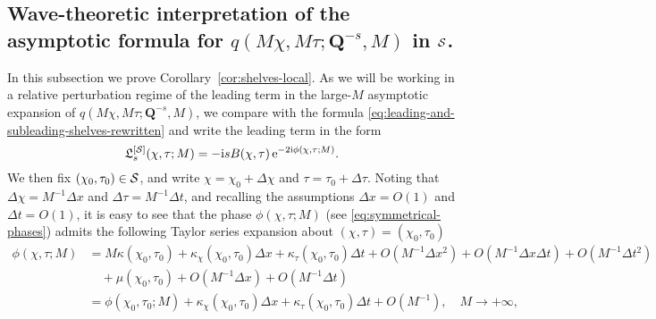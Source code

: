 \subsection{Wave-theoretic interpretation of the asymptotic formula for $q(M\chi, M\tau; \mathbf{Q}^{-s}, M)$ in $\mathcal{S}$.} 
\label{sec:wave-theoretic-interpretation}
In this subsection we prove Corollary~\ref{cor:shelves-local}.
As we will be working in a relative perturbation regime of the leading term in the large-$M$ asymptotic expansion of $q(M\chi,M\tau; \mathbf{Q}^{-s}, M)$, we compare with the formula \eqref{eq:leading-and-subleading-shelves-rewritten} and write the leading term in the form
\begin{equation}
\mathfrak{L}_s^{[\mathcal{S}]}(\chi,\tau;M) =  -\mathrm{i} s B(\chi,\tau) \,\mathrm{e}^{-2\mathrm{i} \phi(\chi,\tau;M)}.
\label{eq:q-0-bun}
\end{equation}
We then fix $(\chi_0,\tau_0)\in\mathcal{S}$, and write $\chi = \chi_0 + \Delta \chi$ and $ \tau = \tau_0 + \Delta \tau$.
Noting that $\Delta \chi = M^{-1} \Delta x$ and $\Delta \tau = M^{-1} \Delta t$, and recalling the assumptions $\Delta x = O(1)$ and $\Delta t = O(1)$, it is easy to see that the phase $\phi(\chi,\tau;M)$ (see \eqref{eq:symmetrical-phases}) admits the following Taylor series expansion about $(\chi,\tau) = (\chi_0, \tau_0)$
\begin{equation}
\begin{split}
\phi(\chi,\tau;M) 
&= M \kappa(\chi_0,\tau_0) + \kappa_\chi (\chi_0,\tau_0)\Delta x + \kappa_\tau (\chi_0,\tau_0)\Delta t + O(M^{-1}\Delta x^2) + O(M^{-1}\Delta x \Delta t) + O(M^{-1}\Delta t^2) \\
&\quad+ \mu(\chi_0,\tau_0) + O(M^{-1}\Delta x) + O(M^{-1}\Delta t)\\
&=\phi(\chi_0,\tau_0; M) + \kappa_\chi (\chi_0,\tau_0)\Delta x + \kappa_\tau (\chi_0,\tau_0)\Delta t + O(M^{-1}),\quad M\to +\infty,
\end{split}
\label{eq:Omega-0-expand-1}
\end{equation}
